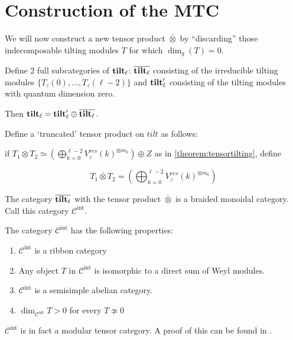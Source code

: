 \section{Construction of the MTC}
\label{MTC-construction}


We will now construct a new tensor product $\bar{\otimes}$ by ``discarding''
those indecomposable tilting modules $T$ for which $\dim_q(T) = 0$.

Define 2 full subcategories of $\mathbf{tilt}_\ell$: $\overline{\mathbf{tilt}_\ell}$ consisting of the
irreducible tilting modules $\{T_z(0), \ldots, T_z(\ell - 2)\}$ and $\mathbf{tilt}_\ell'$
consisting of the tilting modules with quantum dimension zero. 

Then $\mathbf{tilt}_\ell= \mathbf{tilt}_\ell' \oplus \overline{\mathbf{tilt}_\ell}$. %


Define a `truncated' tensor product on $\overline{tilt}$ as follows:

if $T_1 \otimes T_2 \simeq \left(\bigoplus_{k=0}^{\ell - 2} V_z^{res}(k)^{\otimes m_k}\right) \oplus Z$ as in \ref{theorem:tensortilting}, define 

\begin{equation}
T_1 \overline{\otimes} T_2 =  \left(\bigoplus_{k=0}^{\ell - 2} V_z^{res}(k)^{\otimes m_k}\right) 
\end{equation}

The category $\overline{\mathbf{tilt}_\ell}$ with the tensor product $\overline{\otimes}$ is
a braided monoidal category. Call this category $\mathcal{C}^{\text{int}}$.

The category $\mathcal{C}^\text{int}$ has the following properties:
\begin{enumerate}
    \item  $\mathcal{C}^\text{int}$ is a ribbon category
    \item Any object $T$ in $\mathcal{C}^\text{int}$ is isomorphic to a direct sum of Weyl modules.
    \item $\mathcal{C}^\text{int}$ is a semisimple abelian category. 
    \item $\dim_{\mathcal{C}^\text{int}} T > 0$ for every $T \not\simeq 0$
\end{enumerate}

$\mathcal{C}^\text{int}$ is in fact a modular tensor category. A proof of this
can be found in \cite{Kirillov}. 
 
